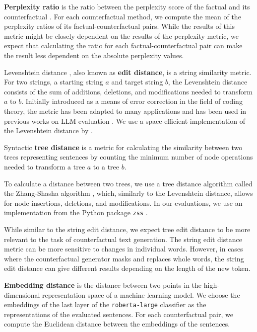 \documentclass[11pt]{article}
\begin{document}
\textbf{Perplexity ratio} is the ratio between the perplexity score of the factual and its counterfactual \cite{bhan_tigtec_2023}. For each counterfactual method, we compute the mean of the perplexity ratios of its factual-counterfactual pairs. While the results of this metric might be closely dependent on the results of the perplexity metric, we expect that calculating the ratio for each factual-counterfactual pair can make the result less dependent on the absolute perplexity values.

Levenshtein distance \cite{levenshtein_binary_1965}, also known as \textbf{edit distance}, is a string similarity metric. For two strings, a starting string $a$ and target string $b$, the Levenshtein distance consists of the sum of additions, deletions, and modifications needed to transform $a$ to $b$. Initially introduced as a means of error correction in the field of coding theory, the metric has been adapted to many applications \cite{haldar_levenshtein_2011} and has been used in previous works on LLM evaluation \cite{buszydlik_red_2023}. We use a space-efficient implementation of the Levenshtein distance by \citet{haldar_levenshtein_2011}.

Syntactic \textbf{tree distance} is a metric for calculating the similarity between two trees representing sentences by counting the minimum number of node operations needed to transform a tree $a$ to a tree $b$. 

To calculate a distance between two trees, we use a tree distance algorithm called the Zhang-Shasha algorithm \cite{zhang_simple_1989}, which, similarly to the Levenshtein distance, allows for node insertions, deletions, and modifications. In our evaluations, we use an implementation from the Python package \texttt{zss} \cite{henderson_zhang-shasha_nodate}.

While similar to the string edit distance, we expect tree edit distance to be more relevant to the task of counterfactual text generation. The string edit distance metric can be more sensitive to changes in individual words. However, in cases where the counterfactual generator masks and replaces whole words, the string edit distance can give different results depending on the length of the new token. 

\textbf{Embedding distance} is the distance between two points in the high-dimensional representation space of a machine learning model. We choose the embeddings of the last layer of the \texttt{roberta-large} classifier as the representations of the evaluated sentences. For each counterfactual pair, we compute the Euclidean distance between the embeddings of the sentences. 
\end{document}
